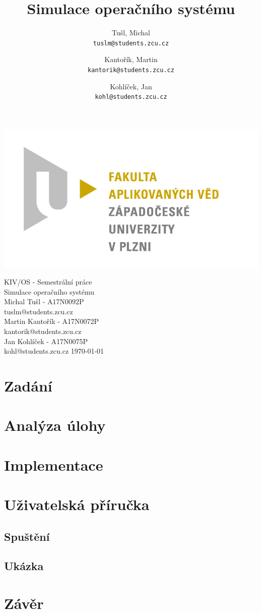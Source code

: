 \documentclass[12pt]{report}
\title{Simulace operačního systému}
\author{
  Tušl, Michal\\
  \texttt{tuslm@students.zcu.cz}
  \and
  Kantořík, Martin\\
  \texttt{kantorik@students.zcu.cz}
  \and
  Kohlíček, Jan\\
  \texttt{kohl@students.zcu.cz}
}
\begin{document}
\begin{titlepage}
\begin{flushleft} 
{\includegraphics[width=.5\textwidth]{./img/fav_logo.jpg}\\[3cm]}
\end{flushleft}
\begin{center}

{\Large KIV/OS - Semestrální práce}\\
\vspace{0.3cm}
{\Huge Simulace operačního systému}\\
\vspace{1cm}
{\large Michal Tušl - A17N0092P}\\
\vspace{0.1cm}
{\normalsize tuslm@students.zcu.cz}\\
\vspace{0.7cm}
{\large Martin Kantořík - A17N0072P}\\
\vspace{0.1cm}
{\normalsize kantorik@students.zcu.cz}\\
\vspace{0.7cm}
{\large Jan Kohlíček - A17N0075P}\\
\vspace{0.1cm}
{\normalsize kohl@students.zcu.cz}
\vfill
{\large \today}
\end{center}
\end{titlepage}

\tableofcontents
\thispagestyle{empty}

\chapter{Zadání}

\chapter{Analýza úlohy}

\chapter{Implementace}



\chapter{Uživatelská příručka}
\section{Spuštění}

\section{Ukázka}


\chapter{Závěr}
\end{document}
